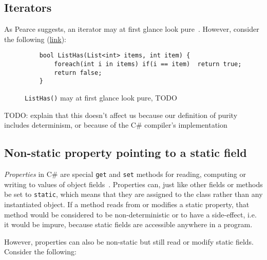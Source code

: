 \documentclass[a4paper,12pt]{article}
\begin{document}
\subsection{Iterators} \label{sub:iterators}


As Pearce suggests, an iterator may at first glance look pure~\cite{pearce2011jpure}. However, consider the following (\href{https://docs.microsoft.com/en-us/archive/msdn-magazine/2017/april/essential-net-understanding-csharp-foreach-internals-and-custom-iterators-with-yield}{link}):

\begin{figure}[H]
  \centering
  \begin{lstlisting}
    bool ListHas(List<int> items, int item) {
        foreach(int i in items) if(i == item)  return true;
        return false;
    }
  \end{lstlisting}
  \caption{\texttt{ListHas()} may at first glance look pure, TODO}
  \label{fig:iterator-example}
\end{figure}

TODO: explain that this doesn't affect us because our definition of purity includes determinism, or because of the C\# compiler's implementation

\subsection{Non-static property pointing to a static field} \label{sub:non-static-property}
\textit{Properties} in C\# are special \texttt{get} and \texttt{set} methods for reading, computing or writing to values of object fields~\cite{microsoft-properties}. Properties can, just like other fields or methods be set to \texttt{static}, which means that they are assigned to the class rather than any instantiated object. If a method reads from or modifies a static property, that method would be considered to be non-deterministic or to have a side-effect, i.e. it would be impure, because static fields are accessible anywhere in a program.

However, properties can also be non-static but still read or modify static fields. Consider the following:
\end{document}
